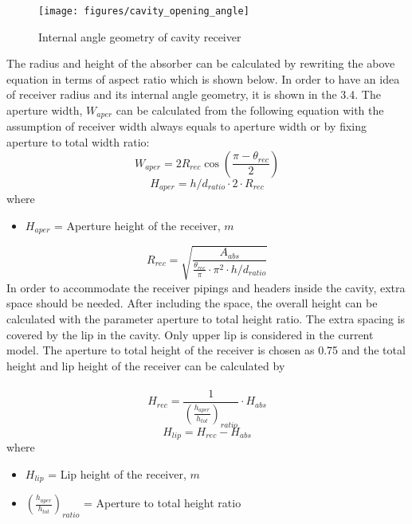 \begin{figure}[hb]
	\texttt{[image: figures/cavity\_opening\_angle]}
	\centering
	\caption{Internal angle geometry of cavity receiver \cite{Feierabend.2010}}	
\end{figure}
The radius and height of the absorber can be calculated by rewriting the above equation in terms of aspect ratio which is shown below. In order to have an idea of receiver radius and its internal angle geometry, it is shown in the \figurename{ 3.4}. The aperture width, $W_{aper}$ can be calculated from the following equation with the assumption of receiver width always equals to aperture width or by fixing aperture to total width ratio:
\begin{equation}
	W_{aper} = 2 R_{rec} \cos \left( \frac{\pi - \theta_{rec}}{2} \right)
\end{equation}
\begin{equation}
	H_{aper} = h/d_{ratio} \cdot 2 \cdot R_{rec}
\end{equation}
where
\begin{itemize}
	\item  $H_{aper}$ = Aperture height of the receiver, $m$
\end{itemize}
\begin{equation}
	R_{rec} = \sqrt{\frac{A_{abs}} {\frac{\theta_{rec}} {\pi} \cdot \pi^2 \cdot h/d_{ratio}}}
\end{equation}
In order to accommodate the receiver pipings and headers inside the cavity, extra space should be needed. After including the space, the overall height can be calculated with the parameter aperture to total height ratio. The extra spacing is covered by the lip in the cavity. Only upper lip is considered in the current model. The aperture to total height of the receiver is chosen as 0.75 and the total height and lip height of the receiver can be calculated by \\\\
\begin{equation}
	H_{rec} = \frac{1} {\left(\frac{h_{aper}}{h_{tot}}\right)_{ratio}} \cdot H_{abs}
\end{equation}
\begin{equation}
	H_{lip} = H_{rec} - H_{abs}
\end{equation}
where
\begin{itemize} 
	\item $H_{lip}$ = Lip height of the receiver, $m$
	\item $\left(\frac{h_{aper}}{h_{tot}}\right)_{ratio}$ = Aperture to total height ratio
\end{itemize}

